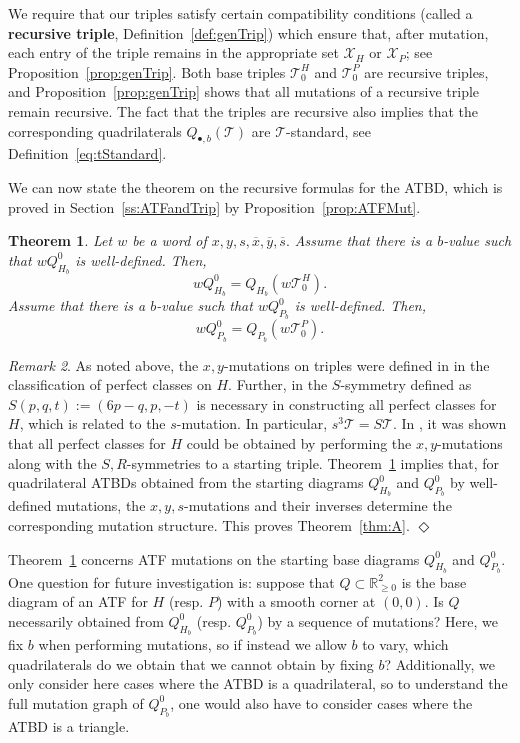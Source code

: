 \documentclass[11pt, reqno]{amsart}
\newtheorem{thm}{Theorem}[subsection]
\theoremstyle{remark}
\numberwithin{equation}{subsection}
\numberwithin{figure}{section}
\theoremstyle{customremark}
\newtheorem{rmk_no_diamond}[thm]{Remark}
\newenvironment{rmk}{\begin{rmk_no_diamond} } {\hfill$\er$ \end{rmk_no_diamond}}
\newcommand{\Tt}{\mathcal{T}}
\newcommand{\ov}{\overline}
\newcommand{\er}{{\Diamond}}
\newcommand{\R}{\mathbb{R}}
\newcommand{\T}{\mathcal{T}}
\begin{document}
We require that our triples satisfy certain compatibility conditions (called a \textbf{recursive triple}, Definition~\ref{def:genTrip}) which ensure that, after mutation, each entry of the triple remains in the
appropriate set \(\mathcal X_H\) or \(\mathcal X_P\); see
Proposition~\ref{prop:genTrip}. Both base triples $\mathcal{T}^H_0$ and $\mathcal{T}^P_0$ are recursive triples, and Proposition~\ref{prop:genTrip} shows that all mutations of a recursive triple remain recursive. The fact that the triples are recursive also implies that the corresponding quadrilaterals $Q_{\bullet,b}(\Tt)$ are $\T$-standard, see Definition~\ref{eq:tStandard}. 


We can now state the theorem on the recursive formulas for the ATBD, which is proved in Section~\ref{ss:ATFandTrip} by Proposition~\ref{prop:ATFMut}. 


\begin{thm} \label{thm:ATFMut}
    Let $w$ be a word of $x,y,s,\ov{x},\ov{y},\ov{s}.$ Assume that there is a $b$-value such that $wQ_{H_b}^0$ is well-defined. Then,
    \[ wQ_{H_b}^0=Q_{H_b}(w\T_0^H).\]
    Assume that there is a $b$-value such that $wQ_{P_b}^0$ is well-defined. Then,
    \[ wQ_{P_b}^0=Q_{P_b}(w\T_0^P).\]
\end{thm}



\begin{rmk} \label{rmk:ATFmut} 
    As noted above, the $x,y$-mutations on triples were defined in \cite{MMW} in the classification of perfect classes on $H$. Further, in \cite{MM,MMW} the $S$-symmetry defined as $S(p,q,t):=(6p-q,p,-t)$ is necessary in constructing all perfect classes for $H$, which is related to the $s$-mutation. In particular, $s^3\Tt=S\Tt.$  In \cite{MMW}, it was shown that all perfect classes for $H$ could be obtained by performing the $x,y$-mutations along with the $S,R$-symmetries to a starting triple. Theorem~\ref{thm:ATFMut} implies that, for quadrilateral ATBDs obtained from the starting diagrams $Q_{H_b}^0$ and $Q_{P_b}^0$ by well-defined mutations, the $x,y,s$-mutations and their inverses determine the corresponding mutation structure. This proves Theorem~\ref{thm:A}.
\end{rmk}

Theorem~\ref{thm:ATFMut} concerns ATF mutations on the starting base diagrams $Q_{H_b}^0$ and $Q_{P_b}^0.$ One question for future investigation is: suppose that $Q \subset \R^2_{\ge 0}$ is the base diagram of an ATF for $H$ (resp. $P$) with a smooth corner at $(0,0).$ Is $Q$ necessarily obtained from $Q_{H_b}^0$ (resp. $Q_{P_b}^0$) by a sequence of mutations? Here, we fix $b$ when performing mutations, so if instead we allow $b$ to vary, which quadrilaterals do we obtain that we cannot obtain by fixing $b$? Additionally, we only consider here cases where the ATBD is a quadrilateral, so to understand the full mutation graph of $Q_{P_b}^0$, one would also have to consider cases where the ATBD is a triangle.
\end{document}
